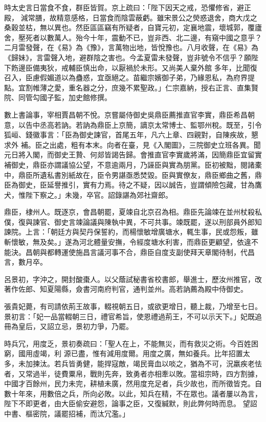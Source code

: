 \begin{pinyinscope}
 時太史言日當食不食，群臣皆賀。京上疏曰：「陛下因天之戒，恐懼修省，避正殿，
 減常膳，故精意感格，日當食而陰雲蔽虧。雖宋景公之熒惑退舍，商大戊之桑穀並枯，無以異也。然臣區區竊有所疑者，自寶元初，定襄地震，壞城郭，覆廬舍，壓死者以數萬人。殆今十年，震動不已，豈非西、北二邊，有窺中國之意乎？二月雷發聲，在《易》為《豫》，言萬物出地，皆悅豫也。八月收聲，在《易》為《歸妹》，言雷聲入地，避群陰之害也。今孟夏雷未發聲，豈非號令不信乎？願陛下飭邊臣備夷狄，戒輔臣慎出命，以厭禍於未形。又尚美人棄外館
 多年，比聞復召入，臣慮假媚道以為蠱惑，宜亟絕之。苗繼宗嬪御子弟，乃緣恩私，為府界提點。宜割帷薄之愛，重名器之分，庶幾不累聖政。」仁宗嘉納，授右正言、直集賢院、同管勾國子監，加史館修撰。



 數上書論事，宰相賈昌朝不悅。京嘗屬侍御史吳鼎臣薦推直官李實，鼎臣希昌朝意，以告中丞高若訥。若訥為鼎臣上京簡，謫京太常博士、監鄂州稅。既至，引令狐峘、錢徽事言：「臣為御史諫官，首尾五年，凡六上章、四親對，自陳疾故，懇求外
 補。臣之出處，粗有本末。向者在臺，見《入閣圖》，三院御史立班各異。聞元日將入閣，而御史王贄、何郯皆謁告歸。會推直官李實歲將滿，因簡鼎臣宜留實補御史，鼎臣亦謂議協公望，不意逾兩月，乃誣臣與實為朋黨。臣初被黜，閱諸橐中，鼎臣所遺私書別紙故在，臣令男諶亟悉焚毀。臣與實僚友，鼎臣鄉曲之舊，鼎臣為御史，臣延譽推引，實有力焉。待之不疑，因以誠告，豈謂傾險包藏，甘為鷹犬，惟陛下察之。」未幾，卒官。詔錄諶為郊社齋郎。



 鼎臣，棣州人。既逐京，會昌朝罷，夏竦自北京召為相。鼎臣先論竦在並州杖殺私僕，復與諫官、御史言竦論議與陳執中異，不可共事。竦既罷，遂以刑部員外郎知諫院。上言：「朝廷方與契丹保誓約，而楊懷敏增廣塘水，輒生事，民或怨叛，雖斬懷敏，無及矣。」遂為河北體量安撫，令經度塘水利害，而鼎臣更顧望，依違不能決。昌朝與都轉運使施昌言議河事不合，鼎臣自度支副使拜天章閣待制，代昌言，數月卒。



 呂景初，字沖之，開封酸棗人。以父蔭試秘書省校書郎，舉進士，歷汝州推官，改著作佐郎、知夏陽縣，僉書河南府判官，通判並州。高若訥薦為殿中侍御史。



 張貴妃薨，有司請依荊王故事，輟視朝五日，或欲更增日，聽上裁，乃增至七日。景初言：「妃一品當輟朝三日，禮官希旨，使恩禮過荊王，不可以示天下。」妃既追冊為皇后，又詔立忌，景初力爭，乃罷。



 時兵冗，用度乏，景初奏疏曰：「聖人在上，不能無災，而有救災之術。今百姓困窮，國用虛竭，利
 源已盡，惟有減用度爾。用度之廣，無如養兵。比年招置太多，未加揀汰。若兵皆勇健，能捍寇敵，竭民膏血以啖之，猶為不可，況羸疾老怯者，又常過半，徒費粟帛，戰則先奔，致勇者亦相牽以敗。當祖宗時，四方割據，中國才百餘州，民力未完，耕植未廣，然用度充足者，兵少故也，而所徵皆克。自數十年來，用數倍之兵，所向必敗。以此，知兵在精，不在眾也。議者屢以為言，陛下不即更者，由大臣偷安避怨，論事之臣，又復緘默，則此弊何時而息。
 望詔中書、樞密院，議罷招補，而汰冗濫。」




\end{pinyinscope}
